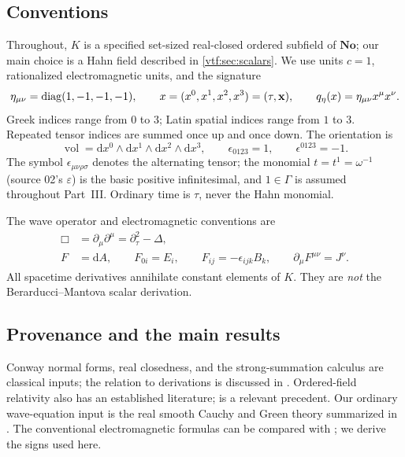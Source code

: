 \documentclass[11pt,letterpaper]{article}
\theoremstyle{definition}
\theoremstyle{remark}
\newcommand{\No}{\mathbf{No}}
\newcommand{\vol}{\operatorname{vol}}\newcommand{\GL}{\operatorname{GL}}
\newcommand{\dd}{\mathrm d}
\newcommand{\eps}{\varepsilon}
\begin{document}
\subsection{Conventions}
Throughout, $K$ is a specified set-sized real-closed ordered subfield of $\No$; our main choice is a Hahn field described in \cref{vtf:sec:scalars}. We use units $c=1$, rationalized electromagnetic units, and the signature
\begin{equation}\label{vtf:mink:eq:metric}
 \eta_{\mu\nu}=\operatorname{diag}(1,-1,-1,-1),\qquad
 x=(x^0,x^1,x^2,x^3)=(\tau,\mathbf x),\qquad
 q_\eta(x)=\eta_{\mu\nu}x^\mu x^\nu.
\end{equation}
Greek indices range from $0$ to $3$; Latin spatial indices range from $1$ to $3$. Repeated tensor indices are summed once up and once down. The orientation is
\begin{equation}
 \vol=\dd x^0\wedge\dd x^1\wedge\dd x^2\wedge\dd x^3,
 \qquad \epsilon_{0123}=1,\qquad\epsilon^{0123}=-1.
\end{equation}
The symbol $\epsilon_{\mu\nu\rho\sigma}$ denotes the alternating tensor; the monomial $t=t^1=\omega^{-1}$ (source 02's $\eps$) is the basic positive
infinitesimal, and $1\in\Gamma$ is assumed throughout Part~III. Ordinary time is $\tau$, never the Hahn monomial.

The wave operator and electromagnetic conventions are
\begin{align}
 \Box&=\partial_\mu\partial^\mu=\partial_\tau^2-\Delta,\label{vtf:mink:eq:box}\\
 F&=\dd A,\qquad F_{0i}=E_i,\qquad
 F_{ij}=-\epsilon_{ijk}B_k,\qquad
 \partial_\mu F^{\mu\nu}=J^\nu.\label{vtf:mink:eq:maxconventions}
\end{align}
All spacetime derivatives annihilate constant elements of $K$. They are \emph{not} the Berarducci--Mantova scalar derivation.

\subsection{Provenance and the main results}
Conway normal forms, real closedness, and the strong-summation calculus are classical inputs; the relation to derivations is discussed in \cite{Conway,Gonshor,MM,BM}. Ordered-field relativity also has an established literature; \cite{MSS} is a relevant precedent. Our ordinary wave-equation input is the real smooth Cauchy and Green theory summarized in \cite{Bar,BGP}. The conventional electromagnetic formulas can be compared with \cite{TongEM,TongRad}; we derive the signs used here.
\end{document}

